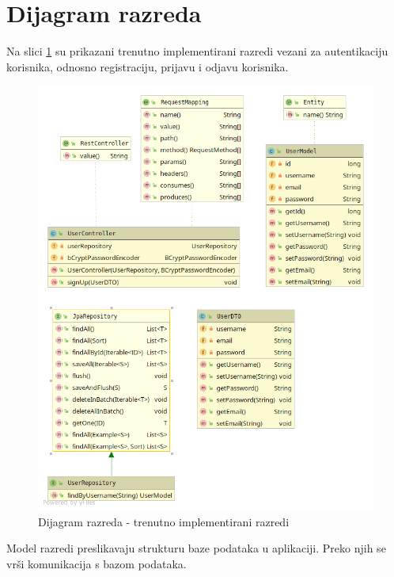 			\eject
			
			
		\section{Dijagram razreda}
		
			Na slici \ref{fig:dijagramRazreda} su prikazani trenutno implementirani razredi vezani za autentikaciju korisnika, odnosno registraciju, prijavu i odjavu korisnika.
			
			\begin{figure}[H]
				\includegraphics[width=1.0\linewidth]{slike/dijagramRazreda.png}
				\centering
				\caption{Dijagram razreda - trenutno implementirani razredi}
				\label{fig:dijagramRazreda}
			\end{figure}
		
			Model razredi preslikavaju strukturu baze podataka u aplikaciji. Preko njih se vrši komunikacija s bazom podataka.
			

